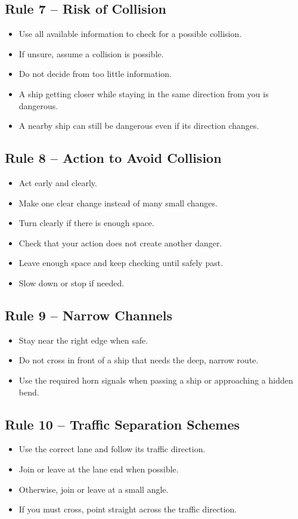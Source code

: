 \documentclass[10pt]{reportMaster}
\begin{document}
\subsection*{Rule 7 -- Risk of Collision}
\begin{itemize}
\item Use all available information to check for a possible collision.
\item If unsure, assume a collision is possible.
\item Do not decide from too little information.
\item A ship getting closer while staying in the same direction from you is dangerous.
\item A nearby ship can still be dangerous even if its direction changes.
\end{itemize}

\subsection*{Rule 8 -- Action to Avoid Collision}
\begin{itemize}
\item Act early and clearly.
\item Make one clear change instead of many small changes.
\item Turn clearly if there is enough space.
\item Check that your action does not create another danger.
\item Leave enough space and keep checking until safely past.
\item Slow down or stop if needed.
\end{itemize}

\subsection*{Rule 9 -- Narrow Channels}
\begin{itemize}
\item Stay near the right edge when safe.
\item Do not cross in front of a ship that needs the deep, narrow route.
\item Use the required horn signals when passing a ship or approaching a hidden bend.
\end{itemize}

\subsection*{Rule 10 -- Traffic Separation Schemes}
\begin{itemize}
\item Use the correct lane and follow its traffic direction.
\item Join or leave at the lane end when possible.
\item Otherwise, join or leave at a small angle.
\item If you must cross, point straight across the traffic direction.
\end{itemize}
\end{document}
